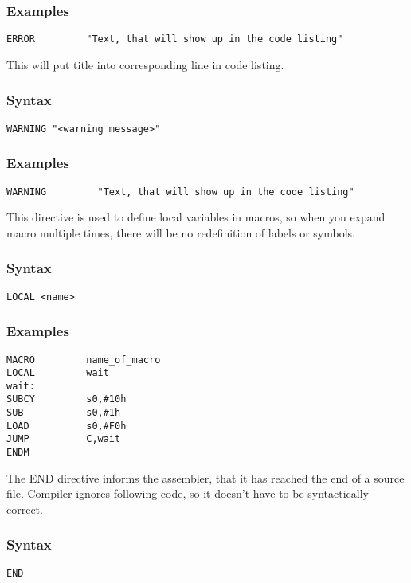     \subsubsection{Examples}
        \verb'ERROR         "Text, that will show up in the code listing"'

    This will put title into corresponding line in code listing.

    \subsubsection{Syntax}
        \verb'WARNING "<warning message>"'

    \subsubsection{Examples}
        \verb'WARNING         "Text, that will show up in the code listing"'

    This directive is used to define local variables in macros, so when you expand macro multiple times, there will be no redefinition of labels or symbols.

    \subsubsection{Syntax}
        \verb'LOCAL <name>'

    \subsubsection{Examples}
        \verb'MACRO         name_of_macro'\\
        \verb'LOCAL         wait'\\
        \verb'wait:'\\
        \verb'SUBCY         s0,#10h'\\
        \verb'SUB           s0,#1h' \\
        \verb'LOAD          s0,#F0h'\\
        \verb'JUMP          C,wait'\\
        \verb'ENDM'

    The END directive informs the assembler, that it has reached the end of a source file. Compiler ignores following code, so it doesn't have to be syntactically correct.

    \subsubsection{Syntax}
        \verb'END'

